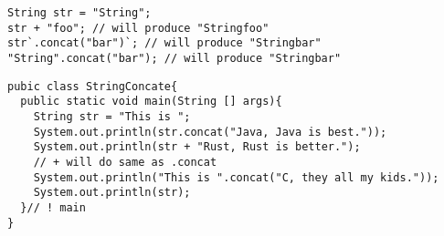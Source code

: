 \documentclass[
  11pt, %
  xcolor=dvipsnames
]{beamer}
\begin{document}
\begin{frame}[fragile]
	\begin{columns}[c]
		\begin{column}{0.9\textwidth}

			\begin{lstlisting}[style=Java]
String str = "String";
str + "foo"; // will produce "Stringfoo"
str`.concat("bar")`; // will produce "Stringbar"
"String".concat("bar"); // will produce "Stringbar"
      \end{lstlisting}


			\begin{lstlisting}[style=Java]
pubic class StringConcate{
  public static void main(String [] args){
    String str = "This is ";
    System.out.println(str.concat("Java, Java is best."));
    System.out.println(str + "Rust, Rust is better.");
    // + will do same as .concat
    System.out.println("This is ".concat("C, they all my kids."));
    System.out.println(str);
  }// ! main
}
      \end{lstlisting}


		\end{column}
	\end{columns}

\end{frame}
\end{document}
